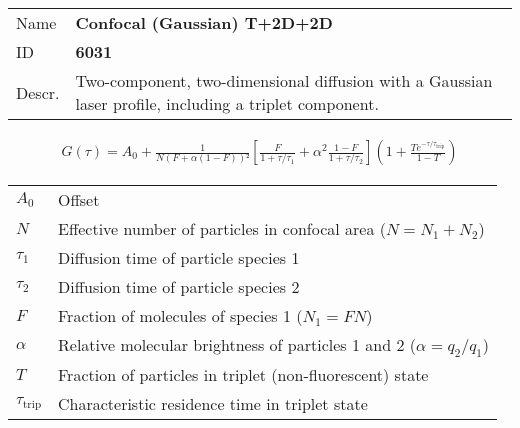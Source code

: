 \noindent \begin{tabular}{lp{}}
Name & \textbf{Confocal (Gaussian) T+2D+2D} \\ 
ID & \textbf{6031} \\ 
Descr. &  Two-component, two-dimensional diffusion with a Gaussian laser profile, including a triplet component\cite{Elson1974, Aragon1976, Palmer1987, Thomps:bookFCS2002}. \\ 
\end{tabular}
\begin{align}
G(\tau) = A_0 + \frac{1}{N (F + \alpha (1-F))²} \left[ \frac{F}{1+\tau/\tau_1} + \alpha^2 \frac{1-F}{ 1+\tau/\tau_2 } \right] \left(1 + \frac{T e^{-\tau/\tau_\mathrm{trip}}}{1-T}  \right) 
\end{align} 
\begin{center}
\begin{tabular}{ll}
$A_0$ & Offset \\ 
$N$ & Effective number of particles in confocal area ($N = N_1+N_2$) \\ 
$\tau_1$ &  Diffusion time of particle species 1 \\ 
$\tau_2$ &  Diffusion time of particle species 2 \\ 
$F$ & Fraction of molecules of species 1 ($N_1 = F N$) \\
$\alpha$ & Relative molecular brightness of particles 1 and 2 ($ \alpha = q_2/q_1$) \\
$T$ &  Fraction of particles in triplet (non-fluorescent) state\\ 
$\tau_\mathrm{trip}$ &  Characteristic residence time in triplet state \\ 
\end{tabular}
\end{center}
\vspace{2em}



